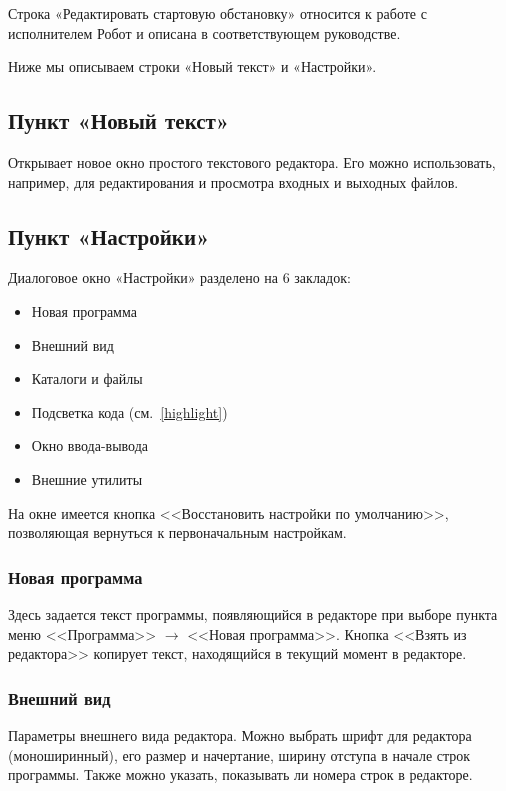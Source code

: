 Строка «Редактировать стартовую обстановку» относится к работе с исполнителем Робот и описана в соответствующем руководстве.

Ниже мы описываем строки «Новый текст» и «Настройки».

\subsection{Пункт «Новый текст»}

Открывает новое окно простого текстового редактора. Его можно использовать, например, для редактирования и просмотра входных и выходных файлов.

\subsection{Пункт «Настройки»}

Диалоговое окно «Настройки» разделено на 6 закладок:
\begin{itemize}
\item Новая программа
\item Внешний вид
\item Каталоги и файлы
\item Подсветка кода (см.~\ref{highlight})
\item Окно ввода-вывода
\item Внешние утилиты
\end{itemize}

На окне имеется кнопка <<Восстановить настройки по умолчанию>>, позволяющая вернуться к первоначальным настройкам.

\subsubsection{Новая программа}

Здесь задается текст программы, появляющийся в редакторе при выборе пункта меню <<Программа>> $\to$ <<Новая программа>>. Кнопка <<Взять из редактора>> копирует текст, находящийся в текущий момент в редакторе.

\subsubsection{Внешний вид}
\label{settings-view}

Параметры внешнего вида редактора. Можно выбрать шрифт для редактора (моноширинный), его размер и начертание, ширину отступа в начале строк программы. Также можно указать, показывать ли номера строк в редакторе.

